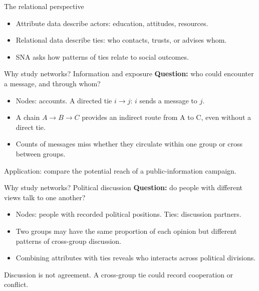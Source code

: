 \documentclass[aspectratio=169,11pt]{beamer}
\begin{document}
\begin{frame}{The relational perspective}
\begin{itemize}
\item Attribute data describe actors: education, attitudes, resources.
\medskip
\item Relational data describe ties: who contacts, trusts, or advises whom.
\medskip
\item SNA asks how patterns of ties relate to social outcomes.
\medskip
\end{itemize}

\end{frame}

\begin{frame}{Why study networks? Information and exposure}
\textbf{Question:} who could encounter a message, and through whom?
\begin{itemize}
\item Nodes: accounts. A directed tie $i\to j$: $i$ sends a message to $j$.
\medskip
\item A chain $A\to B\to C$ provides an indirect route from A to C, even without a direct tie.
\medskip
\item Counts of messages miss whether they circulate within one group or cross between groups.
\end{itemize}
\medskip
\textcolor{accent}{Application: compare the potential reach of a public-information campaign.}
\end{frame}

\begin{frame}{Why study networks? Political discussion}
\textbf{Question:} do people with different views talk to one another?
\begin{itemize}
\item Nodes: people with recorded political positions. Ties: discussion partners.
\medskip
\item Two groups may have the same proportion of each opinion but different patterns of cross-group discussion.
\medskip
\item Combining attributes with ties reveals who interacts across political divisions.
\end{itemize}
\medskip
\textcolor{accent}{Discussion is not agreement. A cross-group tie could record cooperation or conflict.}
\end{frame}
\end{document}
